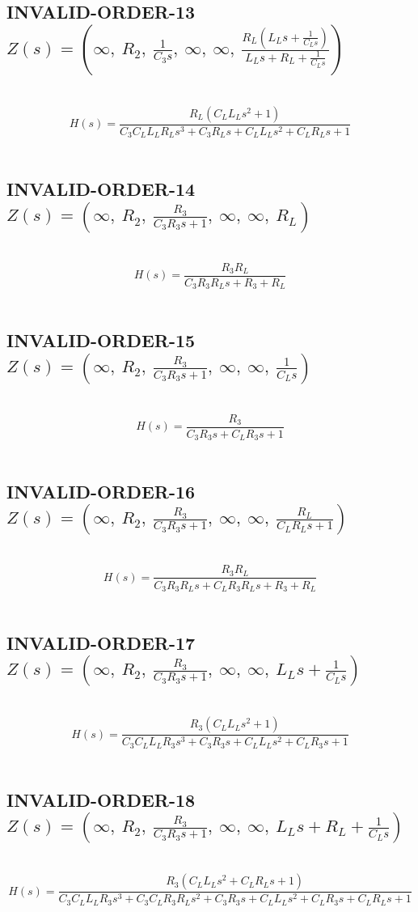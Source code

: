\documentclass{article}
\begin{document}
\subsection{INVALID-ORDER-13 $Z(s) = \left( \infty, \  R_{2}, \  \frac{1}{C_{3} s}, \  \infty, \  \infty, \  \frac{R_{L} \left(L_{L} s + \frac{1}{C_{L} s}\right)}{L_{L} s + R_{L} + \frac{1}{C_{L} s}}\right)$ } \ 
\textbf{\[H(s) = \frac{R_{L} \left(C_{L} L_{L} s^{2} + 1\right)}{C_{3} C_{L} L_{L} R_{L} s^{3} + C_{3} R_{L} s + C_{L} L_{L} s^{2} + C_{L} R_{L} s + 1}\] } \ 
\subsection{INVALID-ORDER-14 $Z(s) = \left( \infty, \  R_{2}, \  \frac{R_{3}}{C_{3} R_{3} s + 1}, \  \infty, \  \infty, \  R_{L}\right)$ } \ 
\textbf{\[H(s) = \frac{R_{3} R_{L}}{C_{3} R_{3} R_{L} s + R_{3} + R_{L}}\] } \ 
\subsection{INVALID-ORDER-15 $Z(s) = \left( \infty, \  R_{2}, \  \frac{R_{3}}{C_{3} R_{3} s + 1}, \  \infty, \  \infty, \  \frac{1}{C_{L} s}\right)$ } \ 
\textbf{\[H(s) = \frac{R_{3}}{C_{3} R_{3} s + C_{L} R_{3} s + 1}\] } \ 
\subsection{INVALID-ORDER-16 $Z(s) = \left( \infty, \  R_{2}, \  \frac{R_{3}}{C_{3} R_{3} s + 1}, \  \infty, \  \infty, \  \frac{R_{L}}{C_{L} R_{L} s + 1}\right)$ } \ 
\textbf{\[H(s) = \frac{R_{3} R_{L}}{C_{3} R_{3} R_{L} s + C_{L} R_{3} R_{L} s + R_{3} + R_{L}}\] } \ 
\subsection{INVALID-ORDER-17 $Z(s) = \left( \infty, \  R_{2}, \  \frac{R_{3}}{C_{3} R_{3} s + 1}, \  \infty, \  \infty, \  L_{L} s + \frac{1}{C_{L} s}\right)$ } \ 
\textbf{\[H(s) = \frac{R_{3} \left(C_{L} L_{L} s^{2} + 1\right)}{C_{3} C_{L} L_{L} R_{3} s^{3} + C_{3} R_{3} s + C_{L} L_{L} s^{2} + C_{L} R_{3} s + 1}\] } \ 
\subsection{INVALID-ORDER-18 $Z(s) = \left( \infty, \  R_{2}, \  \frac{R_{3}}{C_{3} R_{3} s + 1}, \  \infty, \  \infty, \  L_{L} s + R_{L} + \frac{1}{C_{L} s}\right)$ } \ 
\textbf{\[H(s) = \frac{R_{3} \left(C_{L} L_{L} s^{2} + C_{L} R_{L} s + 1\right)}{C_{3} C_{L} L_{L} R_{3} s^{3} + C_{3} C_{L} R_{3} R_{L} s^{2} + C_{3} R_{3} s + C_{L} L_{L} s^{2} + C_{L} R_{3} s + C_{L} R_{L} s + 1}\] } \ 
\end{document}
